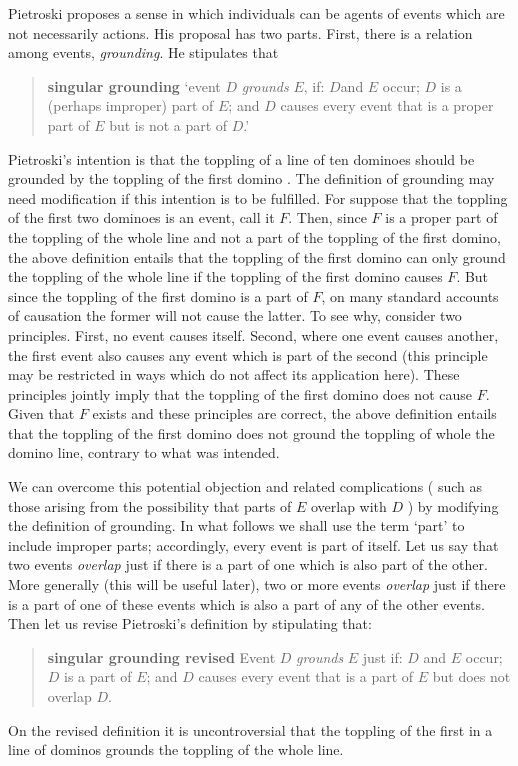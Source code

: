 \documentclass[12pt,a4paper]{extarticle}
\begin{document}
Pietroski proposes a sense in which individuals can be agents of  events which are not necessarily  actions.  
His proposal has two parts.  
First, there is a relation among events, \emph{grounding}.  
He stipulates that 
%
\begin{quote}
\textbf{singular grounding} 
`event $D$ \emph{grounds} $E$, if: $D$and $E$ occur; 
$D$ is a (perhaps improper) part of $E$; and 
$D$ causes every event that is a proper part of $E$ but is not a part of $D$.'
\citep[p.\ 81]{pietroski_actions_1998}
\end{quote}
%
Pietroski's intention is that the toppling of a line of ten dominoes should be grounded by the toppling of the first domino \citep[p.\ 81]{pietroski_actions_1998}.
The definition of grounding may need modification if this intention is to be fulfilled.
For suppose that the toppling of the first two dominoes is an event, call it $F$.
Then, since $F$ is a proper part of the toppling of the whole line and not a part of the toppling of the first domino,
the above definition entails that
the toppling of the first domino can only ground the toppling of the whole line if the toppling of the first domino causes $F$.
But since the toppling of the first domino is a part of $F$, on many standard accounts of causation the former will not cause the latter.
To see why, consider two principles.  
First, no event causes itself.  
Second, where one event causes another, the first event also causes any event which is part of the second (this principle may be restricted in ways which do not affect its application here).  
These principles jointly imply that the toppling of the first domino does not cause $F$.
Given that $F$ exists and these principles are correct, the above definition entails that the toppling of the first domino does not ground the toppling of whole the domino line, contrary to what was intended.

We can overcome this potential objection and related complications (%
such as those arising from the possibility that parts of $E$ overlap with $D$%
) by modifying the definition of grounding.
In what follows we shall use the term `part' to include improper parts; accordingly, every event is part of itself.
Let us say that two events \emph{overlap} just if there is a part of one which is also part of the other.
More generally (this will be useful later),
two or more events \emph{overlap} just if there is a part of one of these events which is also a part of any of the other events.
Then let us revise Pietroski's definition by stipulating that:
%
\begin{quote}
\textbf{singular grounding revised} 
Event $D$ \emph{grounds} $E$  just if: $D$ and $E$ occur; 
$D$ is a  part of $E$; and 
$D$ causes every event that is a part of $E$ but does not overlap $D$.
\end{quote}
%
On the revised definition it is uncontroversial that the toppling of the first in a line of dominos grounds the toppling of the whole line.
\end{document}
